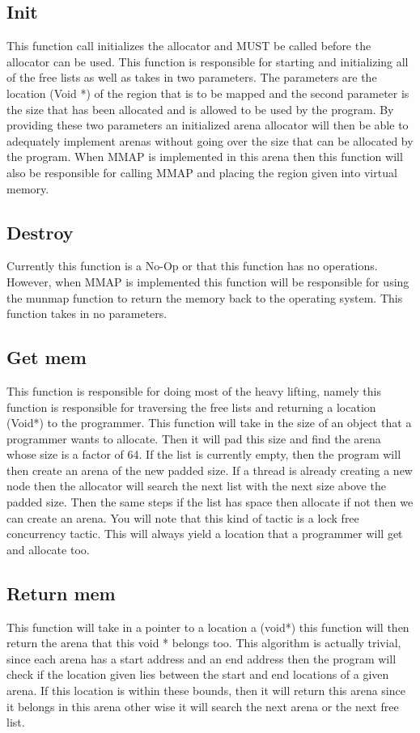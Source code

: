 \documentclass[conference]{IEEEtran}
\begin{document}
\subsection{Init}
This function call initializes the allocator and MUST be called before the allocator can be used. This function is responsible for starting and initializing all of the free lists as well as takes in two parameters. The parameters are the location (Void *) of the region that is to be mapped and the second parameter is the size that has been allocated and is allowed to be used by the program. By providing these two parameters an initialized arena allocator will then be able to adequately implement arenas without going over the size that can be allocated by the program. When MMAP is implemented in this arena then this function will also be responsible for calling MMAP and placing the region given into virtual memory. 
\subsection{Destroy}
Currently this function is a No-Op or that this function has no operations. However, when MMAP is implemented this function will be responsible for using the munmap function to return the memory back to the operating system. This function takes in no parameters. 
\subsection{Get mem}
This function is responsible for doing most of the heavy lifting, namely this function is responsible for traversing the free lists and returning a location (Void*) to the programmer. This function will take in the size of an object that a programmer wants to allocate. Then it will pad this size and find the arena whose size is a factor of 64. If the list is currently empty, then the program will then create an arena of the new padded size. If a thread is already creating a new node then the allocator will search the next list with the next size above the padded size. Then the same steps if the list has space then allocate if not then we can create an arena. You will note that this kind of tactic is a lock free concurrency tactic. This will always yield a location that a programmer will get and allocate too. 
\subsection{Return mem}
This function will take in a pointer to a location a (void*) this function will then return the arena that this void * belongs too. This algorithm is actually trivial, since each arena has a start address and an end address then the program will check if the location given lies between the start and end locations of a given arena. If this location is within these bounds, then it will return this arena since it belongs in this arena other wise it will search the next arena or the next free list.
\end{document}
